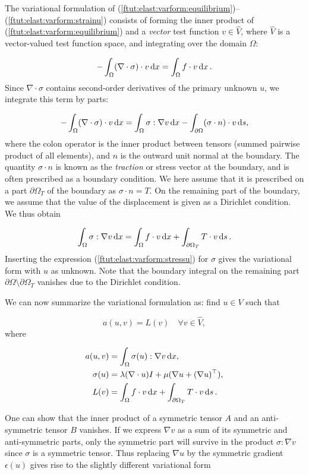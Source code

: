 \documentclass[graybox,envcountchap,sectrefs,final]{svmonodo}
\begin{document}
The variational formulation of
(\ref{ftut:elast:varform:equilibrium})--(\ref{ftut:elast:varform:strainu})
consists of forming the inner product of
(\ref{ftut:elast:varform:equilibrium}) and a \emph{vector} test function
$v\in \hat{V}$, where $\hat{V}$ is a vector-valued test function space, and
integrating over the domain $\Omega$:

\[ -\int_\Omega (\nabla\cdot\sigma) \cdot v \dx =
\int_\Omega f\cdot v\dx\tp\]
Since $\nabla\cdot\sigma$ contains second-order derivatives of the primary
unknown $u$, we integrate this term by parts:

\[ -\int_\Omega (\nabla\cdot\sigma) \cdot v \dx
= \int_\Omega \sigma : \nabla v\dx - \int_{\partial\Omega}
(\sigma\cdot n)\cdot v \ds,\]
where the colon operator is the inner product between tensors (summed
pairwise product of all elements), and $n$ is the outward unit normal
at the boundary. The quantity $\sigma\cdot n$ is known as the
\emph{traction} or stress vector at the boundary, and is often prescribed
as a boundary condition. We here assume that it is prescribed on a part
$\partial\Omega_T$ of the boundary as $\sigma\cdot n = T$. On the
remaining part of the boundary, we assume that the value of the
displacement is given as a Dirichlet condition. We thus obtain

\[
\int_\Omega \sigma : \nabla v \dx =
\int_\Omega f\cdot v \dx
+ \int_{\partial\Omega_T} T\cdot v\ds\tp\]
Inserting the expression (\ref{ftut:elast:varform:stressu}) for
$\sigma$ gives the variational form with $u$ as unknown. Note that the
boundary integral on the remaining part
$\partial\Omega\setminus\partial\Omega_T$ vanishes due to the Dirichlet
condition.

We can now summarize the variational formulation as: find $u\in V$ such that

\begin{equation}
a(u,v) = L(v)\quad\forall v\in\hat{V},
\end{equation}
where

\begin{align}
a(u,v) &= \int_\Omega\sigma(u) :\nabla v \dx,
\label{ftut:elast:varform:sigma_inner_gradv}
\\
\sigma(u) &= \lambda(\nabla\cdot u)I + \mu(\nabla u + (\nabla u)^{\top}),\\
L(v) &= \int_\Omega f\cdot v\dx + \int_{\partial\Omega_T}
T\cdot v\ds\tp
\end{align}

One can show that the inner product of a symmetric tensor $A$ and an
anti-symmetric tensor $B$ vanishes. If we express $\nabla v$ as a sum
of its symmetric and anti-symmetric parts, only the symmetric part will
survive in the product $\sigma :\nabla v$ since $\sigma$ is a
symmetric tensor. Thus replacing $\nabla u$ by the symmetric gradient
$\epsilon(u)$ gives rise to the slightly different variational form
\end{document}
